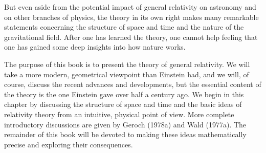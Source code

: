 But even aside from the potential impact of general relativity on astronomy and on
other branches of physics, the theory in its own right makes many remarkable
statements concerning the structure of space and time and the nature of the
gravitational field. After one has learned the theory, one cannot help feeling that one
has gained some deep insights into how nature works.

The purpose of this book is to present the theory of general relativity. We will take
a more modern, geometrical viewpoint than Einstein had, and we will, of course,
discuss the recent advances and developments, but the essential content of the theory
is the one Einstein gave over half a century ago. We begin in this chapter by
discussing the structure of space and time and the basic ideas of relativity theory from
an intuitive, physical point of view. More complete introductory discussions are
given by Geroch (1978a) and Wald (1977a). The remainder of this book will be
devoted to making these ideas mathematically precise and exploring their
consequences.

